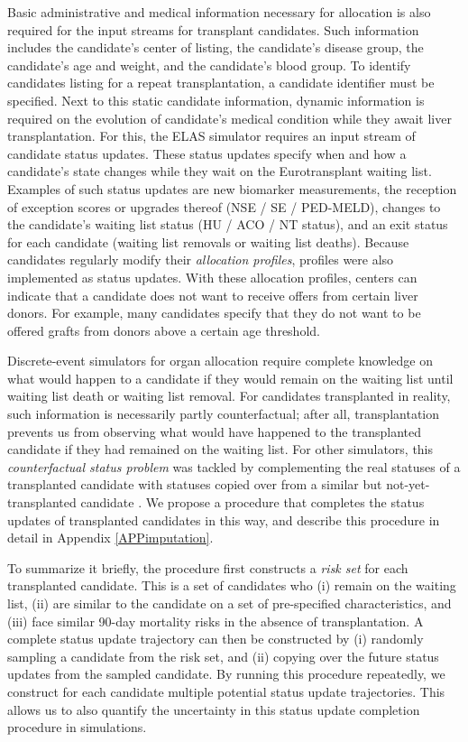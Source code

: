 \documentclass[11pt,twoside,]{book}
\begin{document}
\newpage

Basic administrative and medical information necessary for allocation is also
required for the input streams for transplant candidates. Such information includes the candidate's center of listing,
the candidate's disease group, the candidate's age and weight, and the
candidate's blood group. To identify candidates listing for a repeat
transplantation, a candidate identifier must be specified. Next to
this static candidate information, dynamic information is required on
the evolution of candidate's medical condition while they await liver
transplantation. For this, the ELAS simulator requires an input stream
of candidate status updates. These status updates specify when and how a
candidate's state changes while they wait on the Eurotransplant waiting
list. Examples of such status updates are new biomarker measurements, the
reception of exception scores or upgrades thereof (NSE / SE / PED-MELD),
changes to the candidate's waiting list status (HU / ACO / NT status), and an
exit status for each candidate (waiting list removals or waiting list
deaths). Because candidates regularly modify their \emph{allocation
profiles}, profiles were also implemented as status updates. With these
allocation profiles, centers can indicate that a candidate does not want
to receive offers from certain liver donors. For example, many
candidates specify that they do not want to be offered grafts from
donors above a certain age threshold.

Discrete-event simulators for organ allocation require
complete knowledge on what would happen to a candidate if they would
remain on the waiting list until waiting list death or waiting list
removal. For candidates transplanted in reality, such information is
necessarily partly counterfactual; after all, transplantation prevents
us from observing what would have happened to the transplanted candidate
if they had remained on the waiting list. For other simulators, this
\emph{counterfactual status problem} was tackled by complementing the real
statuses of a transplanted candidate with statuses copied over from a
similar but not-yet-transplanted candidate
\citep{shechterClinicallyBasedDiscreteEvent2005, ThompsonXSAM2004}. We propose a
procedure that completes the status updates of transplanted candidates in this
way, and describe this procedure in detail in Appendix \ref{APPimputation}.

To summarize it briefly, the procedure first constructs a
\emph{risk set} for each transplanted
candidate. This is a set of candidates who
(i) remain on the waiting list, (ii) are similar to the candidate on a set of pre-specified characteristics, and (iii) face similar 90-day mortality risks
in the absence of transplantation. A complete status update trajectory can then be
constructed by (i) randomly sampling a candidate from the risk set, and
(ii) copying over the future status updates from the sampled candidate.
By running this procedure repeatedly, we construct for each candidate
multiple potential status update trajectories. This allows us to also
quantify the uncertainty in this status update completion
procedure in simulations.
\end{document}

